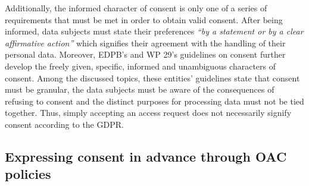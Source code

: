 

Additionally, the informed character of consent is only one of a series of requirements that must be met in order to obtain valid consent. 
After being informed, data subjects must state their preferences \textit{``by a statement or by a clear affirmative action''} \citeyearpar{noauthor_regulation_2016} which signifies their agreement with the handling of their personal data.
Moreover, EDPB's and WP 29's guidelines on consent \citep{european_data_protection_board_guidelines_2020,article_29_data_protection_working_party_opinion_2011,article_29_data_protection_working_party_article_2018} further develop the freely given, specific, informed and unambiguous characters of consent.
Among the discussed topics, these entities' guidelines state that consent must be granular, the data subjects must be aware of the consequences of refusing to consent and the distinct purposes for processing data must not be tied together.
Thus, simply accepting an access request does not necessarily signify consent according to the GDPR.

\subsection{Expressing consent in advance through OAC policies}
\label{sec:consent_advance}

